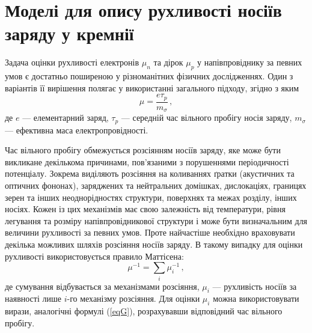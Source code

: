 \documentclass[12pt,a4paper,titlepage,oneside]{book}
\numberwithin{equation}{part}
\begin{document}

\renewcommand\bibname{Список використаних джерел}
\renewcommand{\tablename}{Табл.}

\setcounter{chapter}{1}
\setcounter{section}{1}

\section{Моделі для опису рухливості носіїв заряду у кремнії}\label{Teor}

Задача оцінки рухливості електронів $\mu_n$ та дірок $\mu_p$ у напівпровіднику
за певних умов є достатньо поширеною у різноманітних фізичних дослідженнях.
Один з варіантів її вирішення полягає у використанні загального підходу, згідно з яким
\begin{equation}\label{eqG}
  \mu=\frac{e\tau_p}{m_\sigma}\,,
\end{equation}
де
$e$ --- елементарний заряд,
$\tau_p$ --- середній час вільного пробігу носія заряду,
$m_\sigma$ --- ефективна маса електропровідності.

Час вільного пробігу обмежується розсіянням носіїв заряду, яке може бути викликане декількома причинами,
пов'язаними з порушеннями періодичності потенціалу.
Зокрема виділяють розсіяння на коливаннях ґратки (акустичних та оптичних фононах), заряджених та нейтральних домішках,
дислокаціях, границях зерен та інших неоднорідностях структури, поверхнях та межах розділу, інших носіях.
Кожен із цих механізмів має свою залежність від температури, рівня легування та розміру напівпровідникової структури
і може бути визначальним для величини рухливості за певних умов.
Проте найчастіше необхідно враховувати декілька можливих шляхів розсіяння носіїв заряду.
В такому випадку для оцінки рухливості використовується правило Маттісена:
\begin{equation}\label{eqM}
  \mu^{-1}=\sum_i \mu_i^{-1}\,,
\end{equation}
де
сумування відбувається за механізмами розсіяння,
$\mu_i$ --- рухливість носіїв за наявності лише $i$-го механізму розсіяння.
Для оцінки $\mu_i$ можна використовувати вирази, аналогічні формулі (\ref{eqG}), розрахувавши відповідний час вільного пробігу.
\end{document}
